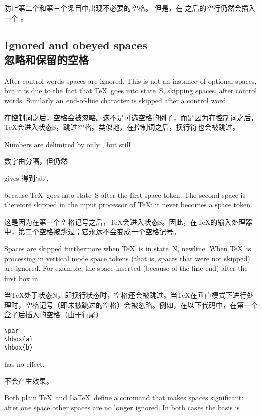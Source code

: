 \begin{itemize}
 防止第二个和第三个条目中出现不必要的空格。
但是，在  之后的空行仍然会插入一个 。
\end{itemize}
\awp


\subsection{Ignored and obeyed spaces\\忽略和保留的空格}

After control words spaces are ignored. This is not an
instance of optional spaces, but it is due to the fact that
\TeX\ goes into state~{\italic S}, skipping spaces, after control
words. Similarly an end-of-line character is skipped
after a control word.

在控制词之后，空格会被忽略。这不是可选空格的例子，而是因为在控制词之后，\TeX 会进入状态{\italic S}，跳过空格。类似地，在控制词之后，换行符也会被跳过。

Numbers are delimited by only ,
but still

数字由分隔，但仍然
\begin{disp}\quad gives 得到\quad `ab',\end{disp}
because \TeX\ goes into state~{\italic S} after the first
space token. The second space is therefore skipped 
in the input processor of \TeX; it never becomes a space token.

这是因为在第一个空格记号之后，\TeX 会进入状态{\italic S}。因此，在\TeX 的输入处理器中，第二个空格被跳过；它永远不会变成一个空格记号。

Spaces are skipped furthermore when \TeX\ is in state~{\italic N},
newline. When \TeX\ is processing in vertical mode
space tokens (that is, spaces that were not skipped)
are ignored. For example, the space inserted (because of the line end)
after the first box in

当\TeX 处于状态{\italic N}，即换行状态时，空格还会被跳过。当\TeX 在垂直模式下进行处理时，空格记号（即未被跳过的空格）会被忽略。例如，在以下代码中，在第一个盒子后插入的空格（由于行尾）
\begin{verbatim}
\par
\hbox{a}
\hbox{b}
\end{verbatim}
has no effect.

不会产生效果。

Both plain \TeX\ and \LaTeX\ define a command 
\altt
that makes spaces significant: after one space other spaces are no
longer ignored. In both cases the basis is


